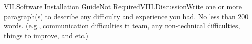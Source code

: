 VII.Software Installation GuideNot RequiredVIII.DiscussionWrite one or more paragraph(s) to describe any difficulty and experience you had. No less than 200 words. (e.g., communication difficulties in team, any non-technical difficulties, things to improve, and etc.) 
